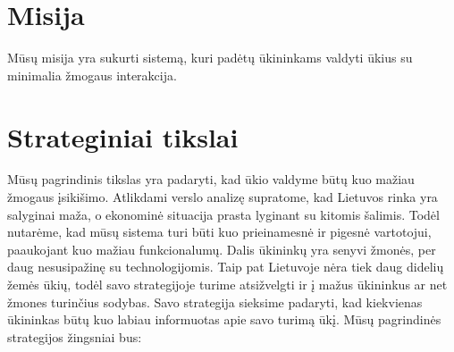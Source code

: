 \documentclass[oneside]{VUMIFPSkursinis}
\begin{document}
\section{Misija}
Mūsų misija yra sukurti sistemą, kuri padėtų ūkininkams valdyti ūkius su minimalia žmogaus interakcija.
\section{Strateginiai tikslai}
	Mūsų pagrindinis tikslas yra padaryti, kad ūkio valdyme būtų kuo mažiau žmogaus įsikišimo. Atlikdami verslo analizę supratome, kad Lietuvos rinka yra salyginai maža, o ekonominė situacija prasta lyginant su kitomis šalimis. Todėl nutarėme, kad mūsų sistema turi būti kuo prieinamesnė ir pigesnė vartotojui, paaukojant kuo mažiau funkcionalumų. Dalis ūkininkų yra senyvi žmonės, per daug nesusipažinę su technologijomis. Taip pat Lietuvoje nėra tiek daug didelių žemės ūkių, todėl savo strategijoje turime atsižvelgti ir į mažus ūkininkus ar net žmones turinčius sodybas. Savo strategija sieksime padaryti, kad kiekvienas ūkininkas būtų kuo labiau informuotas apie savo turimą ūkį. Mūsų pagrindinės strategijos žingsniai bus:
\end{document}
